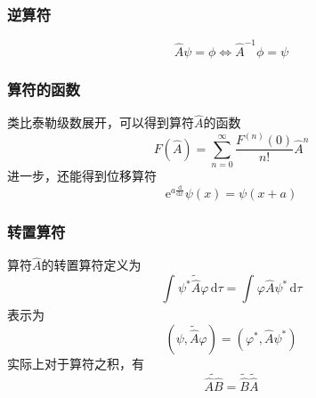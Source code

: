 \subsubsection{逆算符}
$$
    \hat{A}\psi=\phi \iff \hat{A}^{-1}\phi=\psi
$$

\subsubsection{算符的函数}
类比泰勒级数展开，可以得到算符$\hat{A}$的函数
\begin{equation}
    F\left(\hat{A}\right)=\sum_{n=0}^{\infty}\frac{F^{(n)}(0)}{n!}\hat{A}^n
\end{equation}
进一步，还能得到位移算符
$$
    \mathrm{e}^{a\frac{\mathrm{d}}{\mathrm{d}x}}\psi(x) = \psi(x+a)
$$

\subsubsection{转置算符}
算符$\hat{A}$的转置算符定义为
$$
    \int_{}^{}\psi^*\tilde{\hat{A}}\varphi \,\mathrm{d}\tau = \int_{}^{} \varphi\hat{A}\psi^* \,\mathrm{d}\tau
$$
表示为
\begin{equation}
    \left( \psi,\tilde{\hat{A}}\varphi \right) = \left( \varphi^*, \hat{A}\psi^* \right)
\end{equation}
实际上对于算符之积，有
$$
    \widetilde{\hat{A}\hat{B}}=\tilde{\hat{B}}\tilde{\hat{A}}
$$



